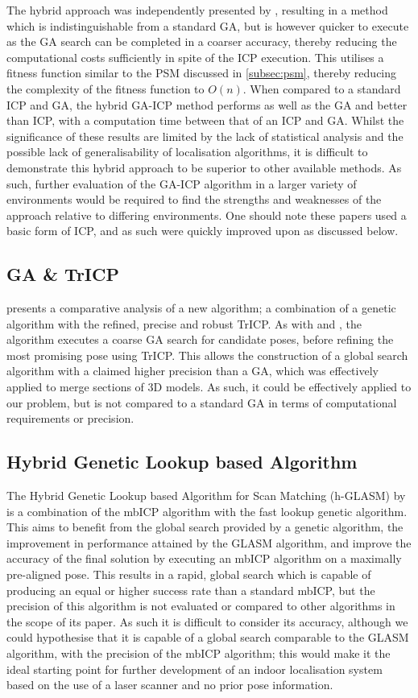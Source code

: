 \documentclass[authoryearcitations]{UoYCSproject}
\begin{document}
The hybrid approach was independently presented by \citet{Martinez2006-ci}, resulting in a method which is indistinguishable from a standard GA, but is however quicker to execute as the GA search can be completed in a coarser accuracy, thereby reducing the computational costs sufficiently in spite of the ICP execution. This utilises a fitness function similar to the PSM discussed in \ref{subsec:psm}, thereby reducing the complexity of the fitness function to $O(n)$. When compared to a standard ICP and GA, the hybrid GA-ICP method performs as well as the GA and better than ICP, with a computation time between that of an ICP and GA. Whilst the significance of these results are limited by the lack of statistical analysis and the possible lack of generalisability of localisation algorithms, it is difficult to demonstrate this hybrid approach to be superior to other available methods. As such, further evaluation of the GA-ICP algorithm in a larger variety of environments would be required to find the strengths and weaknesses of the approach relative to differing environments. One should note these papers used a basic form of ICP, and as such were quickly improved upon as discussed below.


\subsection{GA \& TrICP}
\citet{Lomonosov2006-vq} presents a comparative analysis of a new algorithm; a combination of a genetic algorithm with the refined, precise and robust TrICP. As with \cite{Brunnstrom1996-vo} and \cite{Martinez2006-ci}, the algorithm executes a coarse GA search for candidate poses, before refining the most promising pose using TrICP. This allows the construction of a global search algorithm with a claimed higher precision than a GA, which was effectively applied to merge sections of 3D models. As such, it could be effectively applied to our problem, but is not compared to a standard GA in terms of computational requirements or precision. 

\subsection{Hybrid Genetic Lookup based Algorithm}
The Hybrid Genetic Lookup based Algorithm for Scan Matching (h-GLASM) by \citet{Lenac2011-co} is a combination of the mbICP algorithm with the fast lookup genetic algorithm. This aims to benefit from the global search provided by a genetic algorithm, the improvement in performance attained by the GLASM algorithm, and improve the accuracy of the final solution by executing an mbICP algorithm on a maximally pre-aligned pose. This results in a rapid, global search which is capable of producing an equal or higher success rate than a standard mbICP, but the precision of this algorithm is not evaluated or compared to other algorithms in the scope of its paper. As such it is difficult to consider its accuracy, although we could hypothesise that it is capable of a global search comparable to the GLASM algorithm, with the precision of the mbICP algorithm; this would make it the ideal starting point for further development of an indoor localisation system based on the use of a laser scanner and no prior pose information.
\end{document}

